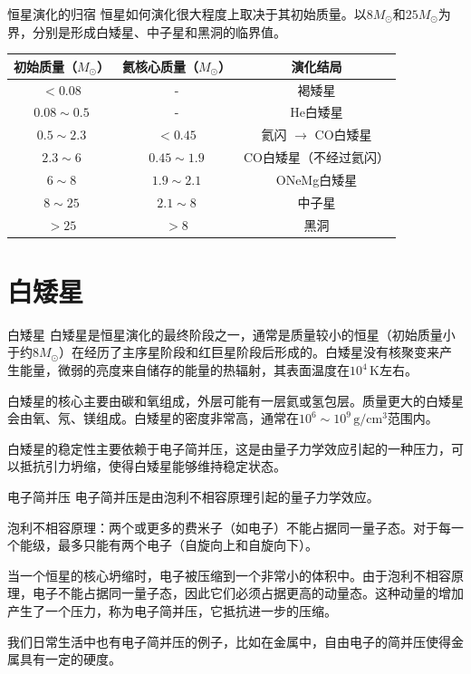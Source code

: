 \documentclass[10pt,aspectratio=1610]{beamer}
\begin{document}
\begin{frame}{恒星演化的归宿}
    恒星\textcolor{mari}{如何演化}很大程度上取决于其\textcolor{dia}{初始质量}。以\textcolor{dia}{$8 M_\odot$}和\textcolor{dia}{$25 M_\odot$}为界，分别是形成\textcolor{mari}{白矮星}、\textcolor{mari}{中子星}和\textcolor{mari}{黑洞}的临界值。

    \begin{table}
    \centering
    \begin{tabular}{ccc}
    \toprule
    \textbf{初始质量（$M_\odot$）} & \textbf{氦核心质量（$M_\odot$）} & \textbf{演化结局} \\
    \midrule
    $< 0.08$ & - & 褐矮星 \\
    $0.08 \sim 0.5$ & - & He白矮星 \\
    $0.5 \sim 2.3$ & $< 0.45$ & 氦闪 $\to$ CO白矮星 \\
    $2.3 \sim 6$ & $0.45 \sim 1.9$ & CO白矮星（不经过氦闪） \\
    $6 \sim 8$ & $1.9 \sim 2.1$ & ONeMg白矮星 \\
    $8 \sim 25$ & $2.1 \sim 8$ & 中子星 \\
    $> 25$ & $> 8$ & 黑洞 \\
    \bottomrule
    \end{tabular}
    \end{table}
\end{frame}

\section{白矮星}

\begin{frame}{白矮星}
    \textcolor{dia}{白矮星}是恒星演化的最终阶段之一，通常是质量较小的恒星（初始质量小于约$8 M_\odot$）在经历了主序星阶段和红巨星阶段后形成的。白矮星没有核聚变来产生能量，微弱的亮度来自储存的能量的热辐射，其表面温度在$10^4\,\mathrm{K}$左右。

    白矮星的核心主要由碳和氧组成，外层可能有一层氦或氢包层。质量更大的白矮星会由氧、氖、镁组成。白矮星的密度非常高，通常在$10^6 \sim 10^9\,\mathrm{g/cm^3}$范围内。

    白矮星的稳定性主要依赖于\textcolor{dia}{电子简并压}，这是由量子力学效应引起的一种压力，可以抵抗引力坍缩，使得白矮星能够维持稳定状态。
\end{frame}

\begin{frame}{电子简并压}
    电子简并压是由泡利不相容原理引起的量子力学效应。

    \textcolor{dia}{泡利不相容原理}：\textcolor{mari}{两个或更多的费米子（如电子）不能占据同一量子态。}对于每一个能级，最多只能有\textcolor{mari}{两个电子（自旋向上和自旋向下）}。

    当一个恒星的核心坍缩时，电子被压缩到一个非常小的体积中。由于泡利不相容原理，电子不能占据同一量子态，因此它们必须占据更高的动量态。这种动量的增加产生了一个压力，称为\textcolor{dia}{电子简并压}，它抵抗进一步的压缩。

    我们日常生活中也有电子简并压的例子，比如在金属中，自由电子的简并压使得金属具有一定的硬度。
\end{frame}
\end{document}
